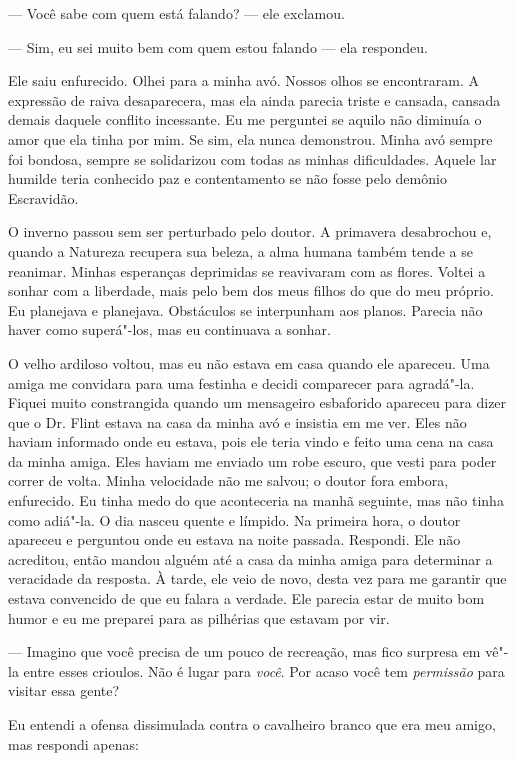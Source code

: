 --- Você sabe com quem está falando?
--- ele exclamou.

--- Sim, eu sei muito bem com quem
estou falando --- ela respondeu.

Ele saiu enfurecido. Olhei para a minha
avó. Nossos olhos se encontraram. A expressão de raiva desaparecera, mas
ela ainda parecia triste e cansada, cansada demais daquele conflito
incessante. Eu me perguntei se aquilo não diminuía o amor que ela tinha
por mim. Se sim, ela nunca demonstrou. Minha avó sempre foi bondosa,
sempre se solidarizou com todas as minhas dificuldades. Aquele lar
humilde teria conhecido paz e contentamento se não fosse pelo demônio
Escravidão.

O inverno passou sem ser perturbado
pelo doutor. A primavera desabrochou e, quando a Natureza recupera sua
beleza, a alma humana também tende a se reanimar. Minhas esperanças
deprimidas se reavivaram com as flores. Voltei a sonhar com a liberdade,
mais pelo bem dos meus filhos do que do meu próprio. Eu planejava e
planejava. Obstáculos se interpunham aos planos. Parecia não haver como
superá"-los, mas eu continuava a sonhar.

O velho ardiloso voltou, mas eu não
estava em casa quando ele apareceu. Uma amiga me convidara para uma
festinha e decidi comparecer para agradá"-la. Fiquei muito constrangida
quando um mensageiro esbaforido apareceu para dizer que o Dr. Flint
estava na casa da minha avó e insistia em me ver. Eles não haviam
informado onde eu estava, pois ele teria vindo e feito uma cena na casa
da minha amiga. Eles haviam me enviado um robe escuro, que vesti para
poder correr de volta. Minha velocidade não me salvou; o doutor fora
embora, enfurecido. Eu tinha medo do que aconteceria na manhã seguinte,
mas não tinha como adiá"-la. O dia nasceu quente e límpido. Na primeira
hora, o doutor apareceu e perguntou onde eu estava na noite passada.
Respondi. Ele não acreditou, então mandou alguém até a casa da minha
amiga para determinar a veracidade da resposta. À tarde, ele veio de
novo, desta vez para me garantir que estava convencido de que eu falara
a verdade. Ele parecia estar de muito bom humor e eu me preparei para as
pilhérias que estavam por vir.

--- Imagino que você precisa de um pouco de recreação, mas fico surpresa
em vê"-la entre esses crioulos. Não é lugar para \emph{você}. Por acaso
você tem \emph{permissão} para visitar essa gente?

Eu entendi a ofensa dissimulada contra
o cavalheiro branco que era meu amigo, mas respondi apenas:

